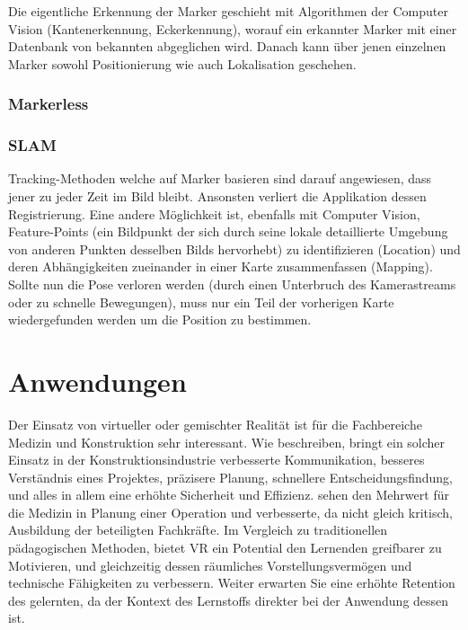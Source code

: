 \documentclass[a4paper]{scrreprt}
\begin{document}
Die eigentliche Erkennung der Marker geschieht mit Algorithmen der Computer Vision (Kantenerkennung, Eckerkennung), worauf ein erkannter Marker mit einer Datenbank von bekannten abgeglichen wird. Danach kann über jenen einzelnen Marker sowohl Positionierung wie auch Lokalisation geschehen.

\subsubsection{Markerless}

\subsubsection{SLAM}
Tracking-Methoden welche auf Marker basieren sind darauf angewiesen, dass jener zu jeder Zeit im Bild bleibt. Ansonsten verliert die Applikation dessen Registrierung. Eine andere Möglichkeit ist, ebenfalls mit Computer Vision, Feature-Points (ein Bildpunkt der sich durch seine lokale detaillierte Umgebung von anderen Punkten desselben Bilds hervorhebt) zu identifizieren (Location) und deren Abhängigkeiten zueinander in einer Karte zusammenfassen (Mapping). Sollte nun die Pose verloren werden (durch einen Unterbruch des Kamerastreams oder zu schnelle Bewegungen), muss nur ein Teil der vorherigen Karte wiedergefunden werden um die Position zu bestimmen.

\section{Anwendungen}

Der Einsatz von virtueller oder gemischter Realität ist für die Fachbereiche Medizin und Konstruktion sehr interessant. Wie \citeauthor{Piroozfar2018} beschreiben, bringt ein solcher Einsatz in der Konstruktionsindustrie verbesserte Kommunikation, besseres Verständnis eines Projektes, präzisere Planung, schnellere Entscheidungsfindung, und alles in allem eine erhöhte Sicherheit und Effizienz. \citeauthor{Pelargos2017} sehen den Mehrwert für die Medizin in Planung einer Operation und verbesserte, da nicht gleich kritisch, Ausbildung der beteiligten Fachkräfte. Im Vergleich zu traditionellen pädagogischen Methoden, bietet VR ein Potential den Lernenden greifbarer zu Motivieren, und gleichzeitig dessen räumliches Vorstellungsvermögen und technische Fähigkeiten zu verbessern. Weiter erwarten Sie eine erhöhte Retention des gelernten, da der Kontext des Lernstoffs direkter bei der Anwendung dessen ist.
\end{document}

